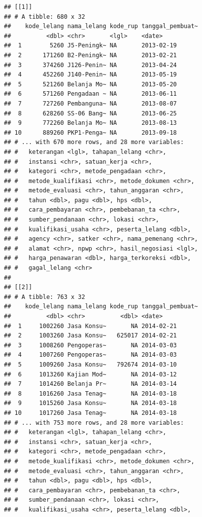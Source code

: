 \documentclass[]{book}
\begin{document}
\begin{verbatim}
## [[1]]
## # A tibble: 680 x 32
##    kode_lelang nama_lelang kode_rup tanggal_pembuat~
##          <dbl> <chr>       <lgl>    <date>          
##  1        5260 J5-Peningk~ NA       2013-02-19      
##  2      171260 B2-Peningk~ NA       2013-02-21      
##  3      374260 J126-Penin~ NA       2013-04-24      
##  4      452260 J140-Penin~ NA       2013-05-19      
##  5      521260 Belanja Mo~ NA       2013-05-20      
##  6      571260 Pengadaan ~ NA       2013-06-11      
##  7      727260 Pembanguna~ NA       2013-08-07      
##  8      628260 SS-06 Bang~ NA       2013-06-25      
##  9      772260 Belanja Mo~ NA       2013-08-13      
## 10      889260 PKP1-Penga~ NA       2013-09-18      
## # ... with 670 more rows, and 28 more variables:
## #   keterangan <lgl>, tahapan_lelang <chr>,
## #   instansi <chr>, satuan_kerja <chr>,
## #   kategori <chr>, metode_pengadaan <chr>,
## #   metode_kualifikasi <chr>, metode_dokumen <chr>,
## #   metode_evaluasi <chr>, tahun_anggaran <chr>,
## #   tahun <dbl>, pagu <dbl>, hps <dbl>,
## #   cara_pembayaran <chr>, pembebanan_ta <chr>,
## #   sumber_pendanaan <chr>, lokasi <chr>,
## #   kualifikasi_usaha <chr>, peserta_lelang <dbl>,
## #   agency <chr>, satker <chr>, nama_pemenang <chr>,
## #   alamat <chr>, npwp <chr>, hasil_negosiasi <lgl>,
## #   harga_penawaran <dbl>, harga_terkoreksi <dbl>,
## #   gagal_lelang <chr>
## 
## [[2]]
## # A tibble: 763 x 32
##    kode_lelang nama_lelang kode_rup tanggal_pembuat~
##          <dbl> <chr>          <dbl> <date>          
##  1     1002260 Jasa Konsu~       NA 2014-02-21      
##  2     1003260 Jasa Konsu~   625017 2014-02-21      
##  3     1008260 Pengoperas~       NA 2014-03-03      
##  4     1007260 Pengoperas~       NA 2014-03-03      
##  5     1009260 Jasa Konsu~   792674 2014-03-10      
##  6     1013260 Kajian Mod~       NA 2014-03-12      
##  7     1014260 Belanja Pr~       NA 2014-03-14      
##  8     1016260 Jasa Tenag~       NA 2014-03-18      
##  9     1015260 Jasa Konsu~       NA 2014-03-18      
## 10     1017260 Jasa Tenag~       NA 2014-03-18      
## # ... with 753 more rows, and 28 more variables:
## #   keterangan <lgl>, tahapan_lelang <chr>,
## #   instansi <chr>, satuan_kerja <chr>,
## #   kategori <chr>, metode_pengadaan <chr>,
## #   metode_kualifikasi <chr>, metode_dokumen <chr>,
## #   metode_evaluasi <chr>, tahun_anggaran <chr>,
## #   tahun <dbl>, pagu <dbl>, hps <dbl>,
## #   cara_pembayaran <chr>, pembebanan_ta <chr>,
## #   sumber_pendanaan <chr>, lokasi <chr>,
## #   kualifikasi_usaha <chr>, peserta_lelang <dbl>,

\end{verbatim}
\end{document}
